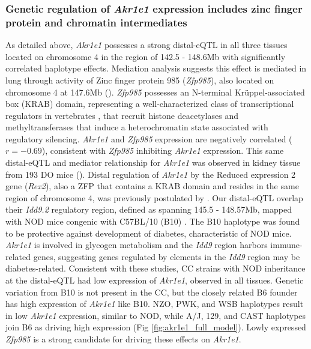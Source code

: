 \documentclass[10pt,letterpaper]{article}
\begin{document}
\subsubsection*{Genetic regulation of \textit{Akr1e1} expression includes zinc finger protein and chromatin intermediates}
As detailed above, \textit{Akr1e1} possesses a strong distal-eQTL in all three tissues located on chromosome 4 in the region of 142.5 - 148.6Mb with significantly correlated haplotype effects. Mediation analysis suggests this effect is mediated in lung through activity of Zinc finger protein 985 (\textit{Zfp985}), also located on chromosome 4 at 147.6Mb (). 
\textit{Zfp985} possesses an N-terminal Kr{\"u}ppel-associated box (KRAB) domain, representing a well-characterized class of transcriptional regulators in vertebrates \cite{Ecco2017}, that recruit histone deacetylases and methyltransferases that induce a heterochromatin state associated with regulatory silencing. 
\textit{Akr1e1} and \textit{Zfp985} expression are negatively correlated ($r = -0.69$), consistent with \textit{Zfp985} inhibiting \textit{Akr1e1} expression. This same distal-eQTL and mediator relationship for \textit{Akr1e1} was observed in kidney tissue from 193 DO mice ().
Distal regulation of \textit{Akr1e1} by the Reduced expression 2 gene (\textit{Rex2}), also a ZFP that contains a KRAB domain and resides in the same region of chromosome 4, was previously postulated by \cite{HamiltonWilliams2013}.
Our distal-eQTL overlap their \textit{Idd9.2} regulatory region, defined as spanning 145.5 - 148.57Mb, mapped with NOD mice congenic with C57BL/10 (B10) \cite{HamiltonWilliams2010}.
The B10 haplotype was found to be protective against development of diabetes, characteristic of NOD mice.
\textit{Akr1e1} is involved in glycogen metabolism and the \textit{Idd9} region harbors immune-related genes, suggesting genes regulated by elements in the \textit{Idd9} region may be diabetes-related. 
Consistent with these studies, CC strains with NOD inheritance at the distal-eQTL had low expression of \textit{Akr1e1}, observed in all tissues.
Genetic variation from B10 is not present in the CC, but the closely related B6 founder has high expression of \textit{Akr1e1} like B10.
NZO, PWK, and WSB haplotypes result in low \textit{Akr1e1} expression, similar to NOD, while A/J, 129, and CAST haplotypes join B6 as driving high expression (Fig \ref{fig:akr1e1_full_model}). Lowly expressed \textit{Zfp985} is a strong candidate for driving these effects on \textit{Akr1e1}.
\end{document}
